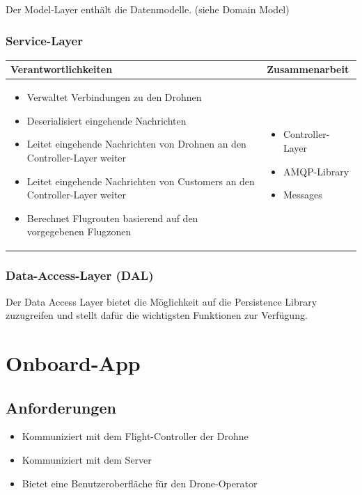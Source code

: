 Der Model-Layer enthält die Datenmodelle. (siehe Domain Model)

\subsubsection{Service-Layer}

\begin{tabular}{|p{}|p{}|} \hline
	\textbf{Verantwortlichkeiten} & \textbf{Zusammenarbeit} \\ \hline \hline
	
	\begin{itemize}
		\item Verwaltet Verbindungen zu den Drohnen
		\item Deserialisiert eingehende Nachrichten
		\item Leitet eingehende Nachrichten von Drohnen an den Controller-Layer weiter	
		\item Leitet eingehende Nachrichten von Customers an den Controller-Layer weiter	
		\item Berechnet Flugrouten basierend auf den vorgegebenen Flugzonen
	\end{itemize}&
	\begin{itemize}
		\item Controller-Layer
		\item AMQP-Library
		\item Messages
	\end{itemize}
	\\ \hline
\end{tabular}

\subsubsection{Data-Access-Layer (DAL)}

Der Data Access Layer bietet die Möglichkeit auf die Persistence Library zuzugreifen und stellt dafür die wichtigsten Funktionen zur Verfügung. 

\section{Onboard-App}

\subsection{Anforderungen}

\begin{itemize}
	\item Kommuniziert mit dem Flight-Controller der Drohne
	\item Kommuniziert mit dem Server
	\item Bietet eine Benutzeroberfläche für den Drone-Operator 
\end{itemize}

